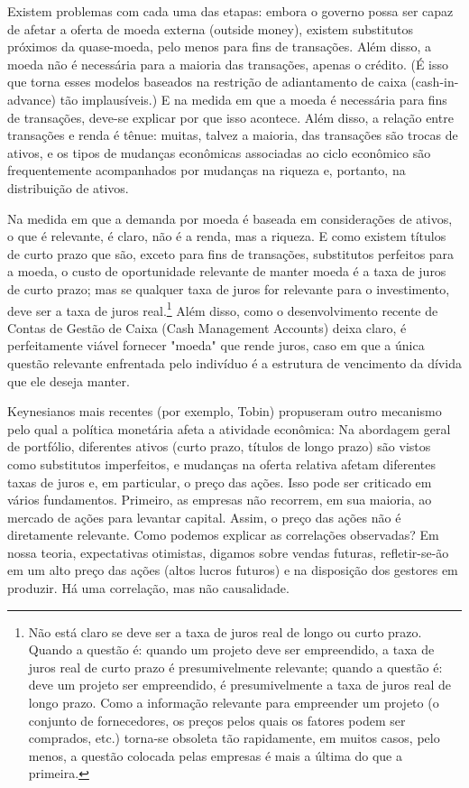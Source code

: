\documentclass[12pt]{article}
\begin{document}
Existem problemas com cada uma das etapas: embora o governo possa ser capaz de afetar a oferta de moeda externa (outside money), existem substitutos próximos da quase-moeda, pelo menos para fins de transações. Além disso, a moeda não é necessária para a maioria das transações, apenas o crédito. (É isso que torna esses modelos baseados na restrição de adiantamento de caixa (cash-in-advance) tão implausíveis.) E na medida em que a moeda é necessária para fins de transações, deve-se explicar por que isso acontece. Além disso, a relação entre transações e renda é tênue: muitas, talvez a maioria, das transações são trocas de ativos, e os tipos de mudanças econômicas associadas ao ciclo econômico são frequentemente acompanhados por mudanças na riqueza e, portanto, na distribuição de ativos.

Na medida em que a demanda por moeda é baseada em considerações de ativos, o que é relevante, é claro, não é a renda, mas a riqueza. E como existem títulos de curto prazo que são, exceto para fins de transações, substitutos perfeitos para a moeda, o custo de oportunidade relevante de manter moeda é a taxa de juros de curto prazo; mas se qualquer taxa de juros for relevante para o investimento, deve ser a taxa de juros real.\footnote{Não está claro se deve ser a taxa de juros real de longo ou curto prazo. Quando a questão é: quando um projeto deve ser empreendido, a taxa de juros real de curto prazo é presumivelmente relevante; quando a questão é: deve um projeto ser empreendido, é presumivelmente a taxa de juros real de longo prazo. Como a informação relevante para empreender um projeto (o conjunto de fornecedores, os preços pelos quais os fatores podem ser comprados, etc.) torna-se obsoleta tão rapidamente, em muitos casos, pelo menos, a questão colocada pelas empresas é mais a última do que a primeira.} Além disso, como o desenvolvimento recente de Contas de Gestão de Caixa (Cash Management Accounts) deixa claro, é perfeitamente viável fornecer "moeda" que rende juros, caso em que a única questão relevante enfrentada pelo indivíduo é a estrutura de vencimento da dívida que ele deseja manter.

Keynesianos mais recentes (por exemplo, Tobin) propuseram outro mecanismo pelo qual a política monetária afeta a atividade econômica: Na abordagem geral de portfólio, diferentes ativos (curto prazo, títulos de longo prazo) são vistos como substitutos imperfeitos, e mudanças na oferta relativa afetam diferentes taxas de juros e, em particular, o preço das ações. Isso pode ser criticado em vários fundamentos. Primeiro, as empresas não recorrem, em sua maioria, ao mercado de ações para levantar capital. Assim, o preço das ações não é diretamente relevante. Como podemos explicar as correlações observadas? Em nossa teoria, expectativas otimistas, digamos sobre vendas futuras, refletir-se-ão em um alto preço das ações (altos lucros futuros) e na disposição dos gestores em produzir. Há uma correlação, mas não causalidade.
\end{document}
